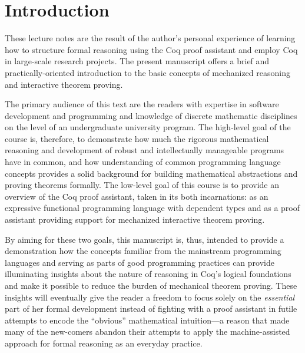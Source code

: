 \begin{coqdoccode}
\end{coqdoccode}



\chapter{Introduction}
\label{ch:intro}



 \begin{coqdoccode}
\coqdocemptyline
\coqdocemptyline
\coqdocemptyline
\coqdocemptyline
\end{coqdoccode}


These lecture notes are the result of the author's personal experience
of learning how to structure formal reasoning using the Coq proof
assistant and employ Coq in large-scale research projects. The present
manuscript offers a brief and practically-oriented introduction to the
basic concepts of mechanized reasoning and interactive theorem
proving.


The primary audience of this text are the readers with expertise in
software development and programming and knowledge of discrete
mathematic disciplines on the level of an undergraduate university
program. The high-level goal of the course is, therefore, to
demonstrate how much the rigorous mathematical reasoning and
development of robust and intellectually manageable programs have in
common, and how understanding of common programming language concepts
provides a solid background for building mathematical abstractions and
proving theorems formally. The low-level goal of this course is to
provide an overview of the Coq proof assistant, taken in its both
incarnations: as an expressive functional programming language with
dependent types and as a proof assistant providing support for
mechanized interactive theorem proving.


By aiming for these two goals, this manuscript is, thus, intended to
provide a demonstration how the concepts familiar from the mainstream
programming languages and serving as parts of good programming
practices can provide illuminating insights about the nature of
reasoning in Coq's logical foundations and make it possible to reduce
the burden of mechanical theorem proving. These insights will
eventually give the reader a freedom to focus solely on the
\textit{essential} part of her formal development instead of fighting with a
proof assistant in futile attempts to encode the ``obvious''
mathematical intuition---a reason that made many of the new-comers
abandon their attempts to apply the machine-assisted approach for
formal reasoning as an everyday practice.


